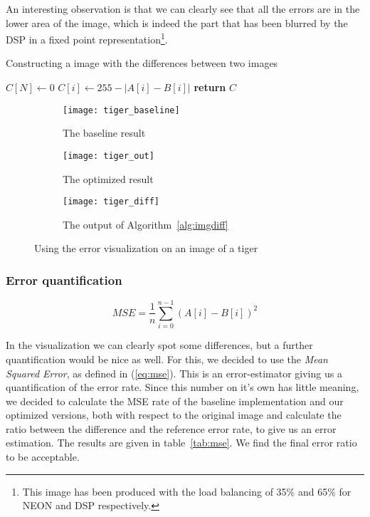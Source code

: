 An interesting observation is that we can clearly see that all the errors are in the lower area of the image, which is indeed the part that has been blurred by the DSP in a fixed point representation\footnote{This image has been produced with the load balancing of 35\% and 65\% for NEON and DSP respectively.}.

\begin{algorithm}[t]
    \caption{Constructing a image with the differences between two images}\label{alg:imgdiff}
    \begin{algorithmic}[1]
        \State $C[N]\gets 0$
           \State $C[i]\gets 255 - |A[i] - B[i]|$
        \EndFor
        \State \textbf{return} $C$
        \EndProcedure
    \end{algorithmic}
\end{algorithm}

\begin{figure*}
    \centering
    \begin{subfigure}[b]{0.3\textwidth}
            \texttt{[image: tiger\_baseline]}
            \caption{The baseline result}
            \label{fig:er_tiger_baseline}
    \end{subfigure}
    \begin{subfigure}[b]{0.3\textwidth}
            \texttt{[image: tiger\_out]}
            \caption{The optimized result}
            \label{fig:er_tiger_out}
    \end{subfigure}
    \begin{subfigure}[b]{0.3\textwidth}
            \texttt{[image: tiger\_diff]}
            \caption{The output of Algorithm~\ref{alg:imgdiff}}
            \label{fig:er_tiger_diff}
    \end{subfigure}
    \caption{Using the error visualization on an image of a tiger}
    \label{fig:imgdiff}
\end{figure*}

\subsubsection{Error quantification}

\begin{equation}
    MSE = \frac{1}{n} \sum_{i=0}^{n-1} (A[i] - B[i])^{2}
    \label{eq:mse}
\end{equation}

In the visualization we can clearly spot some differences, but a further quantification would be nice as well. For this, we decided to use the \emph{Mean Squared Error}, as defined in (\ref{eq:mse}). This is an error-estimator giving us a quantification of the error rate. Since this number on it's own has little meaning, we decided to calculate the MSE rate of the baseline implementation and our optimized versions, both with respect to the original image and calculate the ratio between the difference and the reference error rate, to give us an error estimation. The results are given in table~\ref{tab:mse}. We find the final error ratio to be acceptable.


